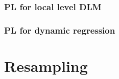 \subsubsection{PL for local level DLM}


\subsubsection{PL for dynamic regression}


\section{Resampling \label{sec:resample}}

